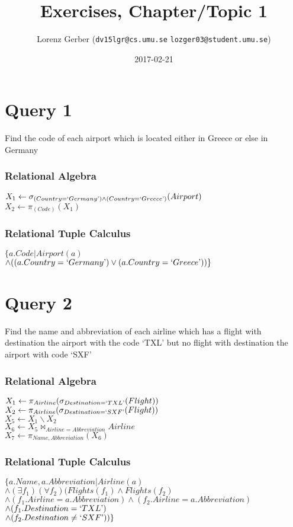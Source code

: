 \documentclass[a4paper,11pt,twoside]{article}
\title{Exercises, Chapter/Topic 1}
\author{Lorenz Gerber ({\tt{dv15lgr@cs.umu.se}} {\tt{lozger03@student.umu.se}})}
\date{2017-02-21}
\begin{document}
\lstset{language=C}
\maketitle
\thispagestyle{empty}
\thispagestyle{empty}
\newpage

\clearpage
{}

\section{Query 1}
Find the code of each airport which is located either in Greece or else in Germany
\subsubsection*{Relational Algebra}
$X_1 \leftarrow \sigma_{(Country = `Germany\textrm') \land (Country = `Greece\textrm')}(Airport)$\\
$X_2 \leftarrow \pi_{(Code)}(X_1)$\\

\subsubsection*{Relational Tuple Calculus}
$\{a.Code|Airport(a)$\\
$\land((a.Country = `Germany\textrm') \lor (a.Country = `Greece\textrm'))\}$

\section{Query 2}
Find the name and abbreviation of each airline which has a flight with destination the airport with the code `TXL' but no flight with destination the airport with code `SXF'
\subsubsection*{Relational Algebra}
$X_1 \leftarrow \pi_{Airline}(\sigma_{Destination=`TXL\textrm'}(Flight))$\\
$X_2 \leftarrow \pi_{Airline}(\sigma_{Destination=`SXF\textrm'}(Flight))$\\
$X_5 \leftarrow X_1 \backslash X_2$\\
$X_6 \leftarrow X_5 \Join_{Airline=Abbreviation} Airline$\\
$X_7 \leftarrow \pi_{Name, Abbreviation}(X_6)$\\

\subsubsection*{Relational Tuple Calculus}
$\{a.Name, a.Abbreviation|Airline(a)$\\
$\land (\exists f_1)(\forall f_2)(Flights(f_1) \land Flights(f_2)$\\
$\land (f_1.Airline = a.Abbreviation) \land (f_2.Airline = a.Abbreviation)$\\
$\land (f_1.Destination = `TXL\textrm')$\\
$\land (f_2.Destination \neq `SXF\textrm'))\}$\\
\end{document}
